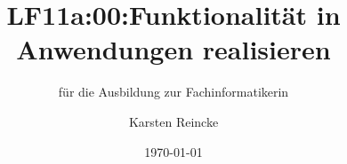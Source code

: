 \documentclass[]{beamer}
\title{LF11a:00:Funktionalität in Anwendungen realisieren}
\subtitle{für die Ausbildung zur Fachinformatikerin}
\institute[GS-LDK]{Gewerbliche Schulen Dillenburg}
\author{Karsten Reincke}
\date{\today}
\def\cfgGl{../../../cfg.gl/}
\begin{document}

\begin{frame}
  \titlepage

  
\end{frame}






\logo{}
\newpage




\end{document}
